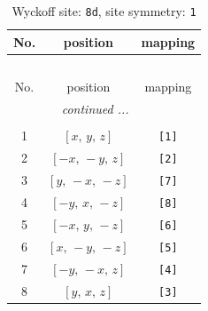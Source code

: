 \documentclass[fleqn,8pt]{jsarticle}
\begin{document}
\begin{longtable}{ccc}
\caption{Wyckoff site: {\tt 8d}, site symmetry: {\tt 1}}
 \\
 \hline \hline
No. & position & mapping \\ \hline \endfirsthead

\multicolumn{2}{l}{\tablename\ \thetable{}} \\
 \hline \hline
No. & position & mapping \\ \hline \endhead

 \hline \hline
\multicolumn{2}{r}{\footnotesize\it continued ...} \\ \endfoot

 \hline \hline
\multicolumn{2}{r}{} \\ \endlastfoot

1 & $\left[ x,\, y,\, z \right]$ & {\tt [1]} \\ \hline
2 & $\left[ - x,\, - y,\, z \right]$ & {\tt [2]} \\ \hline
3 & $\left[ y,\, - x,\, - z \right]$ & {\tt [7]} \\ \hline
4 & $\left[ - y,\, x,\, - z \right]$ & {\tt [8]} \\ \hline
5 & $\left[ - x,\, y,\, - z \right]$ & {\tt [6]} \\ \hline
6 & $\left[ x,\, - y,\, - z \right]$ & {\tt [5]} \\ \hline
7 & $\left[ - y,\, - x,\, z \right]$ & {\tt [4]} \\ \hline
8 & $\left[ y,\, x,\, z \right]$ & {\tt [3]} \\
\end{longtable}
\end{document}
